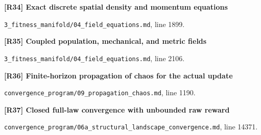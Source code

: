 \documentclass[11pt,a4paper]{article}
\begin{document}
\par\medskip\noindent\begin{minipage}{\linewidth}\textbf{[R34] Exact discrete spatial density and momentum equations}\label{src:thm-algorithmic-spatial-field-equations}\par
{\small\texttt{}\par
\nolinkurl{3_fitness_manifold/04_field_equations.md}, line 1899.\par}
\end{minipage}\par

\par\medskip\noindent\begin{minipage}{\linewidth}\textbf{[R35] Coupled population, mechanical, and metric fields}\label{src:thm-algorithmic-coupled-field-system}\par
{\small\texttt{}\par
\nolinkurl{3_fitness_manifold/04_field_equations.md}, line 2106.\par}
\end{minipage}\par

\par\medskip\noindent\begin{minipage}{\linewidth}\textbf{[R36] Finite-horizon propagation of chaos for the actual update}\label{src:thm-chaos-finite-time-consistency}\par
{\small\texttt{}\par
\nolinkurl{convergence_program/09_propagation_chaos.md}, line 1190.\par}
\end{minipage}\par

\par\medskip\noindent\begin{minipage}{\linewidth}\textbf{[R37] Closed full-law convergence with unbounded raw reward}\label{src:thm-slcw-active-contraction}\par
{\small\texttt{}\par
\nolinkurl{convergence_program/06a_structural_landscape_convergence.md}, line 14371.\par}
\end{minipage}\par
\end{document}
